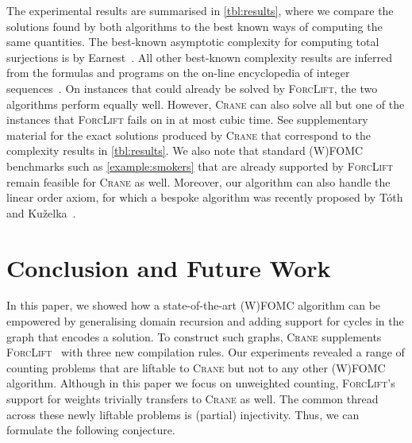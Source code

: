 \documentclass{article}
\theoremstyle{definition}
\theoremstyle{remark}
\begin{document}
The experimental results are summarised in \cref{tbl:results}, where we compare
the solutions found by both algorithms to the best known ways of computing the
same quantities. The best-known asymptotic complexity for computing total
surjections is by Earnest~. All other best-known complexity
results are inferred from the formulas and programs on the on-line encyclopedia
of integer sequences~\cite{oeis}. On instances that could already be solved by
\textsc{ForcLift}, the two algorithms perform equally well. However,
\textsc{Crane} can also solve all but one of the instances that
\textsc{ForcLift} fails on in at most cubic time. See supplementary material for
the exact solutions produced by \textsc{Crane} that correspond to the complexity
results in \cref{tbl:results}. We also note that standard (W)FOMC benchmarks
such as \cref{example:smokers} that are already supported by \textsc{ForcLift}
remain feasible for \textsc{Crane} as well. Moreover, our algorithm can also
handle the linear order axiom, for which a bespoke algorithm was recently
proposed by T{\'{o}}th and
Ku\v{z}elka~.

\section{Conclusion and Future Work}\label{sec:conclusion}

In this paper, we showed how a state-of-the-art (W)FOMC algorithm can be
empowered by generalising domain recursion and adding support for cycles in the
graph that encodes a solution. To construct such graphs, \textsc{Crane}
supplements \textsc{ForcLift}~\cite{DBLP:conf/ijcai/BroeckTMDR11} with three
new compilation rules. Our experiments revealed a range of counting problems
that are liftable to \textsc{Crane} but not to any other (W)FOMC algorithm.
Although in this paper we focus on unweighted counting, \textsc{ForcLift}'s
support for weights trivially transfers to \textsc{Crane} as well. The common
thread across these newly liftable problems is (partial) injectivity. Thus, we
can formulate the following conjecture.
\end{document}
